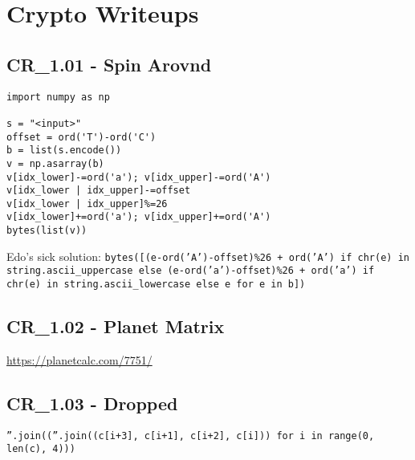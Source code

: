 \chapter{Crypto Writeups}

\section{CR_1.01 - Spin Arovnd}
\begin{verbatim}
import numpy as np

s = "<input>"
offset = ord('T')-ord('C')
b = list(s.encode())
v = np.asarray(b)
v[idx_lower]-=ord('a'); v[idx_upper]-=ord('A')
v[idx_lower | idx_upper]-=offset
v[idx_lower | idx_upper]%=26
v[idx_lower]+=ord('a'); v[idx_upper]+=ord('A')
bytes(list(v))
\end{verbatim} 

Edo's sick solution: \texttt{bytes([(e-ord('A')-offset)\%26 + ord('A') if chr(e) in string.ascii_uppercase else (e-ord('a')-offset)\%26 + ord('a') if chr(e) in string.ascii_lowercase else e for e in b])}

\section{CR_1.02 - Planet Matrix}
\url{https://planetcalc.com/7751/}

\section{CR_1.03 - Dropped}
\texttt{''.join((''.join((c[i+3], c[i+1], c[i+2], c[i])) for i in range(0, len(c), 4)))}